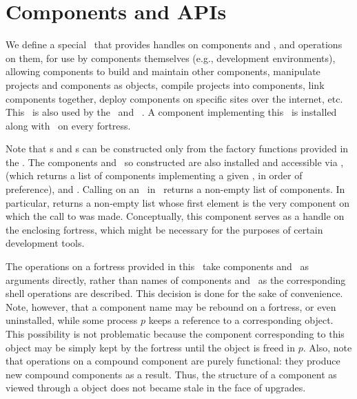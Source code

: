 %
%
%
%

\chapter{Components and APIs}

We define a special  \apiN\ that provides
handles on components and \apisN, 
and operations on them, for use by components themselves (e.g., development
environments), allowing components to build and maintain other components,
manipulate projects and components as objects,
compile projects into components, link components together,
deploy components on specific sites over the internet, etc.
This \apiN\ is also used by the \upgapi\ and \instapi\ \apisN.
A component implementing this \apiN\ is installed along with 
\library\ on every fortress.

Note that s and s 
can be constructed only from the factory functions provided in the \apiN.
The components and \apisN\ so constructed are also installed and 
accessible via ,  (which returns a list of components
implementing a given \apiN, in order of preference), and .
Calling  on an \apiN\ in \library\
returns a non-empty list of components. In particular,
 returns a non-empty 
list whose first element is the very component on which the call to  was made.
Conceptually, this component serves as a handle on the enclosing fortress, which might be necessary
for the purposes of certain development tools.  

The operations on a fortress provided in this \apiN\ take components and \apisN\
as arguments directly, rather than names of components and \apisN\ as the corresponding
shell operations are described. This decision is done for the sake of convenience. Note, however,
that a component name may be rebound on a fortress, or even uninstalled, while some process $p$
keeps a reference to a corresponding \TYP{Component} object. This possibility is not
problematic because the component corresponding to this object may be simply kept by the fortress
until the object is freed in $p$. Also, note that \shellcommand{upgrade} operations
on a compound component are purely
functional: they produce new compound components as a result. Thus, the structure of a component
as viewed through a \TYP{Component} object does not became stale in the face of upgrades.

